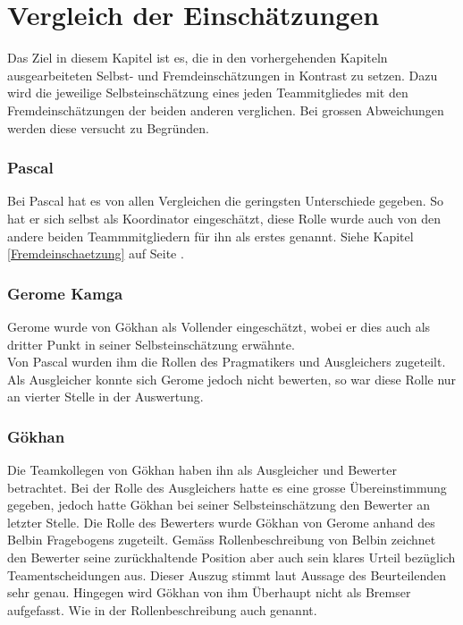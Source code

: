 
\chapter{Vergleich der Einschätzungen}
Das Ziel in diesem Kapitel ist es, die in den vorhergehenden Kapiteln ausgearbeiteten Selbst- und Fremdeinschätzungen in Kontrast zu setzen. Dazu wird die jeweilige Selbsteinschätzung eines jeden Teammitgliedes mit den Fremdeinschätzungen der beiden anderen verglichen. Bei grossen Abweichungen werden diese versucht zu Begründen.   
\subsection*{Pascal}
Bei Pascal hat es von allen Vergleichen die geringsten Unterschiede gegeben. So hat er sich selbst als Koordinator eingeschätzt, diese Rolle wurde auch von den andere beiden Teammmitgliedern für ihn als erstes genannt. Siehe Kapitel \ref{Fremdeinschaetzung} auf Seite \pageref{Fremdeinschaetzung}. 

\subsection*{Gerome Kamga}
Gerome wurde von Gökhan als Vollender eingeschätzt, wobei er dies auch als dritter Punkt in seiner Selbsteinschätzung erwähnte. \\
Von Pascal wurden ihm die Rollen des Pragmatikers und Ausgleichers zugeteilt. Als Ausgleicher konnte sich Gerome jedoch nicht bewerten, so war diese Rolle nur an vierter Stelle in der Auswertung.

\subsection*{Gökhan}
Die Teamkollegen von Gökhan haben ihn als Ausgleicher und Bewerter betrachtet. Bei der Rolle des Ausgleichers hatte es eine grosse Übereinstimmung gegeben, jedoch hatte Gökhan bei seiner Selbsteinschätzung den Bewerter an letzter Stelle. Die Rolle des Bewerters wurde Gökhan von Gerome anhand des Belbin Fragebogens zugeteilt. Gemäss Rollenbeschreibung von Belbin zeichnet den Bewerter seine zurückhaltende Position aber auch sein klares Urteil bezüglich Teamentscheidungen aus. Dieser Auszug stimmt laut Aussage des Beurteilenden sehr genau. Hingegen wird Gökhan von ihm Überhaupt nicht als Bremser aufgefasst. Wie in der Rollenbeschreibung auch genannt.